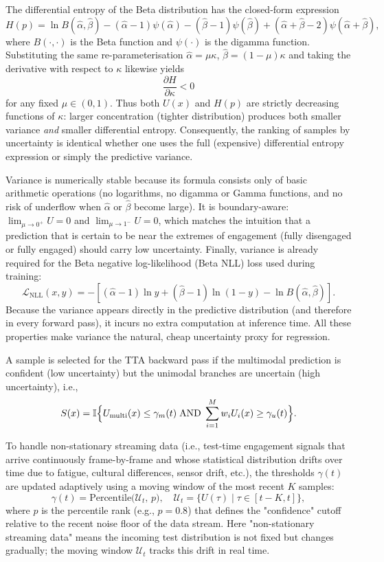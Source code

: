 \documentclass[11pt,a4paper]{article}
\begin{document}
	The differential entropy of the Beta distribution has the closed-form expression
	$$
	H(p) = \ln B(\hat{\alpha},\hat{\beta}) - (\hat{\alpha}-1)\psi(\hat{\alpha}) - (\hat{\beta}-1)\psi(\hat{\beta}) + (\hat{\alpha}+\hat{\beta}-2)\psi(\hat{\alpha}+\hat{\beta}),
	$$
	where $B(\cdot,\cdot)$ is the Beta function and $\psi(\cdot)$ is the digamma function.  
	Substituting the same re-parameterisation $\hat{\alpha}=\mu\kappa$, $\hat{\beta}=(1-\mu)\kappa$ and taking the derivative with respect to $\kappa$ likewise yields
	$$
	\frac{\partial H}{\partial \kappa} < 0
	$$
	for any fixed $\mu \in (0,1)$. Thus both $U(x)$ and $H(p)$ are strictly decreasing functions of $\kappa$: larger concentration (tighter distribution) produces both smaller variance \emph{and} smaller differential entropy.  
	Consequently, the ranking of samples by uncertainty is identical whether one uses the full (expensive) differential entropy expression or simply the predictive variance.
	
	Variance is numerically stable because its formula consists only of basic arithmetic operations (no logarithms, no digamma or Gamma functions, and no risk of underflow when $\hat{\alpha}$ or $\hat{\beta}$ become large).  
	It is boundary-aware: $\lim_{\mu\to 0^+}U=0$ and $\lim_{\mu\to 1^-}U=0$, which matches the intuition that a prediction that is certain to be near the extremes of engagement (fully disengaged or fully engaged) should carry low uncertainty.  
	Finally, variance is already required for the Beta negative log-likelihood (Beta NLL) loss used during training:
	$$
	\mathcal{L}_{\text{NLL}}(x, y) = -[(\hat{\alpha}-1)\ln y + (\hat{\beta}-1)\ln(1-y) - \ln B(\hat{\alpha},\hat{\beta})].
	$$
	Because the variance appears directly in the predictive distribution (and therefore in every forward pass), it incurs no extra computation at inference time.  
	All these properties make variance the natural, cheap uncertainty proxy for regression.
	
	A sample is selected for the TTA backward pass if the multimodal prediction is confident (low uncertainty) but the unimodal branches are uncertain (high uncertainty), i.e.,
	$$
	S(x) = \mathbb{I}\Bigl\{ U_{\text{multi}}(x) \leq \gamma_m(t) \;\text{AND}\; \sum_{i=1}^M w_i U_i(x) \geq \gamma_u(t) \Bigr\}.
	$$
	
	To handle non-stationary streaming data (i.e., test-time engagement signals that arrive continuously frame-by-frame and whose statistical distribution drifts over time due to fatigue, cultural differences, sensor drift, etc.), the thresholds $\gamma(t)$ are updated adaptively using a moving window of the most recent $K$ samples:
	$$
	\gamma(t) = \mathrm{Percentile}\bigl(\mathcal{U}_t,\, p\bigr), \quad
	\mathcal{U}_t = \bigl\{U(\tau) \mid \tau \in [t-K,t]\bigr\},
	$$
	where $p$ is the percentile rank (e.g., $p=0.8$) that defines the "confidence" cutoff relative to the recent noise floor of the data stream. Here "non-stationary streaming data" means the incoming test distribution is not fixed but changes gradually; the moving window $\mathcal{U}_t$ tracks this drift in real time.  
\end{document}
